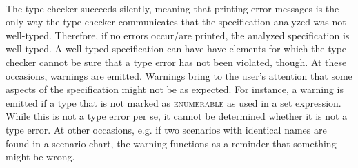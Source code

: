 \paragraph{}
The type checker succeeds silently, meaning that printing error messages is the only way the type checker communicates that the specification analyzed was not well-typed. Therefore, if no errors occur/are printed, the analyzed specification is well-typed. A well-typed specification can have have elements for which the type checker cannot be sure that a type error has not been violated, though. At these occasions, warnings are emitted. Warnings bring to the user's attention that some aspects of the specification might not be as expected. For instance, a warning is emitted if a type that is not marked as \textsc{enumerable} as used in a set expression. While this is not a type error per se, it cannot be determined whether it is not a type error. At other occasions, e.g. if two scenarios with identical names are found in a scenario chart, the warning functions as a reminder that something might be wrong.


